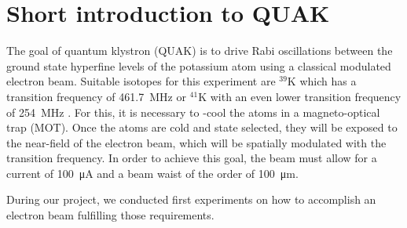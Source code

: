 
\chapter{Short introduction to QUAK}
\label{ch:Short introduction to QuaK}

The goal of quantum klystron (QUAK)\cite{rätzel2020quantum} is to drive Rabi oscillations between the ground state hyperfine levels of the potassium atom using a classical modulated electron beam. Suitable isotopes for this experiment are $^{39}\mathrm{K}$ which has a transition frequency of \SI{461.7}{\mega\hertz} or $^{41}\mathrm{K}$ with an even lower transition frequency of \SI{254}{\mega\hertz} \cite{tiecke:potassium-properties}. For this, it is necessary to -cool the atoms in a magneto-optical trap (MOT). Once the atoms are cold and state selected, they will be exposed to the near-field of the electron beam, which will be spatially modulated with the transition frequency. In order to achieve this goal, the beam must allow for a current of \SI{100}{\micro\ampere} and a beam waist of the order of \SI{100}{\micro\meter}.

During our project, we conducted first experiments on how to accomplish an electron beam fulfilling those requirements.